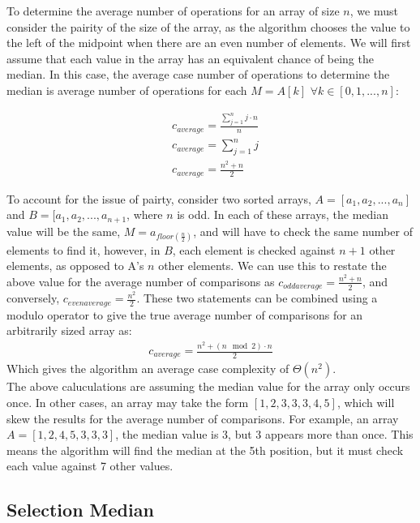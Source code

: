\documentclass{article}
\begin{document}
            To determine the average number of operations for an array of size $n$, we must consider the pairity of the size of the array, as the algorithm chooses the value to the left of the midpoint when there are an even number of elements. We will first assume that each value in the array has an equivalent chance of being the median. In this case, the average case number of operations to determine the median is average number of operations for each $M = A[k]$ $\forall k \in [0, 1, ..., n]$:

            \begin{align}
                & c_{average} = \frac{\sum_{j = 1}^{n} j \cdot n}{n} \\
                & c_{average} = \sum_{j = 1}^n j\\
                & c_{average} = \frac{n^2 + n}{2}
            \end{align}

            To account for the issue of pairty, consider two sorted arrays, $A = [a_1, a_2, ..., a_n]$ and $B = [a_1, a_2, ..., a_{n+1}$, where $n$ is odd. In each of these arrays, the median value will be the same, $M = a_{floor(\frac{n}{2})}$, and will have to check the same number of elements to find it, however, in $B$, each element is checked against $n + 1$ other elements, as opposed to A's $n$ other elements. We can use this to restate the above value for the average number of comparisons as $c_{odd average} = \frac{n^2 + n}{2}$, and conversely, $c_{even average} = \frac{n^2}{2}$. These two statements can be combined using a modulo operator to give the true average number of comparisons for an arbitrarily sized array as:
            \begin{align}
                c_{average} = \frac{n^2 + (n\mod 2) \cdot n}{2}
            \end{align}
            Which gives the algorithm an average case complexity of $\Theta(n^2)$.\\
            The above caluculations are assuming the median value for the array only occurs once. In other cases, an array may take the form $[1, 2, 3, 3, 3, 4, 5]$, which will skew the results for the average number of comparisons. For example, an array $A = [1, 2, 4, 5, 3, 3, 3]$, the median value is 3, but 3 appears more than once. This means the algorithm will find the median at the 5th position, but it must check each value against 7 other values.

    \subsection{Selection Median}
\end{document}
